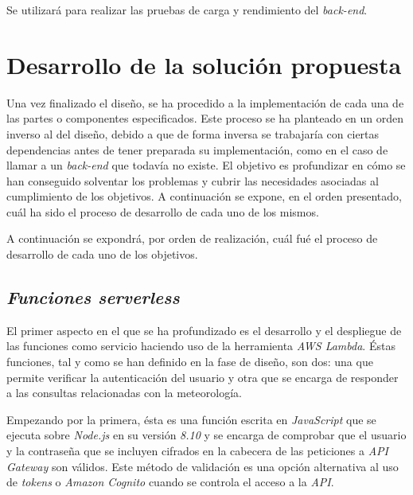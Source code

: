 \documentclass[11pt,spanish,listoffigures]{tfgetsinf}
\begin{document}
Se utilizará para realizar las pruebas de carga y rendimiento del \textit{back-end}.




\chapter{Desarrollo de la solución propuesta}
\label{ch:desarrollo-solucion}

Una vez finalizado el diseño, se ha procedido a la implementación de cada una de las partes o componentes especificados. Este proceso se ha planteado en un orden inverso al del diseño, debido a que de forma inversa se trabajaría con ciertas dependencias antes de tener preparada su implementación, como en el caso de llamar a un \textit{back-end} que todavía no existe. El objetivo es profundizar en cómo se han conseguido solventar los problemas y cubrir las necesidades asociadas al cumplimiento de los objetivos. A continuación se expone, en el orden presentado, cuál ha sido el proceso de desarrollo de cada uno de los mismos.

A continuación se expondrá, por orden de realización, cuál fué el proceso de desarrollo de cada uno de los objetivos.

\section{\textit{Funciones \textit{serverless}}}
\label{sec:development-funciones serverless}

El primer aspecto en el que se ha profundizado es el desarrollo y el despliegue de las funciones como servicio haciendo uso de la herramienta \textit{AWS Lambda}. Éstas funciones, tal y como se han definido en la fase de diseño, son dos: una que permite verificar la autenticación del usuario y otra que se encarga de responder a las consultas relacionadas con la meteorología.

Empezando por la primera, ésta es una función escrita en \textit{JavaScript} que se ejecuta sobre \textit{Node.js} en su versión \textit{8.10} y se encarga de comprobar que el usuario y la contraseña que se incluyen cifrados en la cabecera de las peticiones a \textit{API Gateway} son válidos. Este método de validación es una opción alternativa al uso de \textit{tokens} o \textit{Amazon Cognito} cuando se controla el acceso a la \textit{API}.
\end{document}
